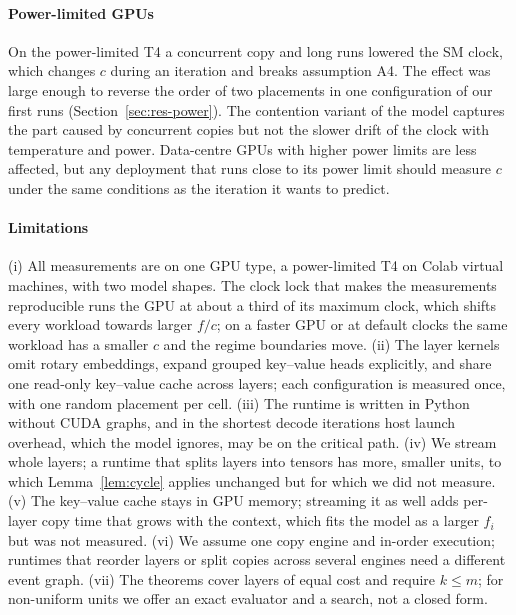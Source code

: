 \paragraph{Power-limited GPUs}
On the power-limited T4 a concurrent copy and long runs lowered the SM clock, which changes $c$ during an iteration and breaks assumption A4. The effect was large enough to reverse the order of two placements in one configuration of our first runs (Section~\ref{sec:res-power}). The contention variant of the model captures the part caused by concurrent copies but not the slower drift of the clock with temperature and power. Data-centre GPUs with higher power limits are less affected, but any deployment that runs close to its power limit should measure $c$ under the same conditions as the iteration it wants to predict.

\paragraph{Limitations}
(i) All measurements are on one GPU type, a power-limited T4 on Colab virtual machines, with two model shapes. The clock lock that makes the measurements reproducible runs the GPU at about a third of its maximum clock, which shifts every workload towards larger $f/c$; on a faster GPU or at default clocks the same workload has a smaller $c$ and the regime boundaries move. (ii) The layer kernels omit rotary embeddings, expand grouped key--value heads explicitly, and share one read-only key--value cache across layers; each configuration is measured once, with one random placement per cell. (iii) The runtime is written in Python without CUDA graphs, and in the shortest decode iterations host launch overhead, which the model ignores, may be on the critical path. (iv) We stream whole layers; a runtime that splits layers into tensors has more, smaller units, to which Lemma~\ref{lem:cycle} applies unchanged but for which we did not measure. (v) The key--value cache stays in GPU memory; streaming it as well adds per-layer copy time that grows with the context, which fits the model as a larger $f_i$ but was not measured. (vi) We assume one copy engine and in-order execution; runtimes that reorder layers or split copies across several engines need a different event graph. (vii) The theorems cover layers of equal cost and require $k\le m$; for non-uniform units we offer an exact evaluator and a search, not a closed form.
